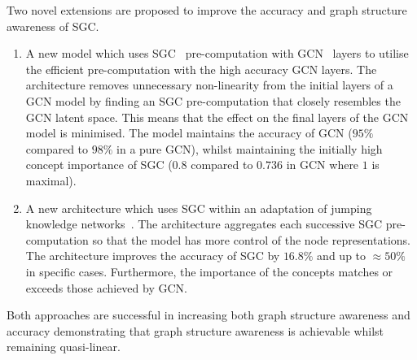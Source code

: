 Two novel extensions are proposed to improve the accuracy and graph structure awareness of SGC.
\begin{enumerate}
    \item
        A new model which uses SGC~\cite{wu2019simplifying} pre-computation with GCN~\cite{kipf2016semi} layers to utilise the efficient pre-computation with the high accuracy GCN layers.
        The architecture removes unnecessary non-linearity from the initial layers of a GCN model by finding an SGC pre-computation that closely resembles the GCN latent space.
        This means that the effect on the final layers of the GCN model is minimised.
        The model maintains the accuracy of GCN ($95\%$ compared to $98\%$ in a pure GCN), whilst maintaining the initially high concept importance of SGC ($0.8$ compared to $0.736$ in GCN where $1$ is maximal).
    \item
        A new architecture which uses SGC within an adaptation of jumping knowledge networks~\cite{xu2018representation}.
        The architecture aggregates each successive SGC pre-computation so that the model has more control of the node representations.
        The architecture improves the accuracy of SGC by $16.8\%$ and up to $\approx 50\%$ in specific cases.
        Furthermore, the importance of the concepts matches or exceeds those achieved by GCN.
\end{enumerate}
Both approaches are successful in increasing both graph structure awareness and accuracy demonstrating that graph structure awareness is achievable whilst remaining quasi-linear.

